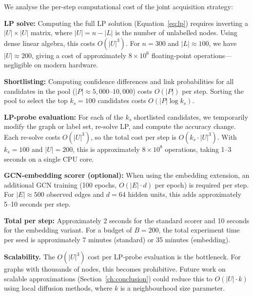 \documentclass[12pt,a4paper,oneside]{report}
\begin{document}
We analyse the per-step computational cost of the joint acquisition strategy:

\textbf{LP solve:} Computing the full LP solution (Equation~\ref{eq:lp}) requires inverting a $|U| \times |U|$ matrix, where $|U| = n - |L|$ is the number of unlabelled nodes. Using dense linear algebra, this costs $O(|U|^3)$. For $n = 300$ and $|L| \approx 100$, we have $|U| \approx 200$, giving a cost of approximately $8 \times 10^6$ floating-point operations---negligible on modern hardware.

\textbf{Shortlisting:} Computing confidence differences and link probabilities for all candidates in the pool ($|P| \approx 5{,}000$--$10{,}000$) costs $O(|P|)$ per step. Sorting the pool to select the top $k_s = 100$ candidates costs $O(|P| \log k_s)$.

\textbf{LP-probe evaluation:} For each of the $k_s$ shortlisted candidates, we temporarily modify the graph or label set, re-solve LP, and compute the accuracy change. Each re-solve costs $O(|U|^3)$, so the total cost per step is $O(k_s \cdot |U|^3)$. With $k_s = 100$ and $|U| = 200$, this is approximately $8 \times 10^8$ operations, taking 1--3 seconds on a single CPU core.

\textbf{GCN-embedding scorer (optional):} When using the embedding extension, an additional GCN training (100 epochs, $O(|E| \cdot d)$ per epoch) is required per step. For $|E| \approx 500$ observed edges and $d = 64$ hidden units, this adds approximately 5--10 seconds per step.

\textbf{Total per step:} Approximately 2 seconds for the standard scorer and 10 seconds for the embedding variant. For a budget of $B = 200$, the total experiment time per seed is approximately 7 minutes (standard) or 35 minutes (embedding).

\textbf{Scalability.} The $O(|U|^3)$ cost per LP-probe evaluation is the bottleneck. For graphs with thousands of nodes, this becomes prohibitive. Future work on scalable approximations (Section~\ref{ch:conclusion}) could reduce this to $O(|U| \cdot k)$ using local diffusion methods, where $k$ is a neighbourhood size parameter.
\end{document}
